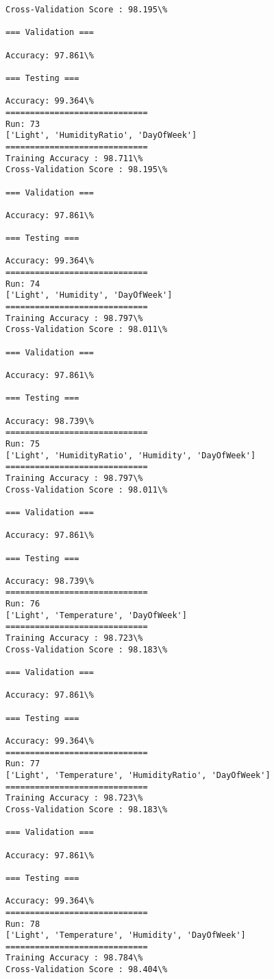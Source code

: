 \documentclass[11pt]{article}
\begin{document}
    \begin{Verbatim}[commandchars=\\\{\}]
Cross-Validation Score : 98.195\%

=== Validation ===

Accuracy: 97.861\%

=== Testing ===

Accuracy: 99.364\%
=============================
Run: 73
['Light', 'HumidityRatio', 'DayOfWeek']
=============================
Training Accuracy : 98.711\%
Cross-Validation Score : 98.195\%

=== Validation ===

Accuracy: 97.861\%

=== Testing ===

Accuracy: 99.364\%
=============================
Run: 74
['Light', 'Humidity', 'DayOfWeek']
=============================
Training Accuracy : 98.797\%
Cross-Validation Score : 98.011\%

=== Validation ===

Accuracy: 97.861\%

=== Testing ===

Accuracy: 98.739\%
=============================
Run: 75
['Light', 'HumidityRatio', 'Humidity', 'DayOfWeek']
=============================
Training Accuracy : 98.797\%
Cross-Validation Score : 98.011\%

=== Validation ===

Accuracy: 97.861\%

=== Testing ===

Accuracy: 98.739\%
=============================
Run: 76
['Light', 'Temperature', 'DayOfWeek']
=============================
Training Accuracy : 98.723\%
Cross-Validation Score : 98.183\%

=== Validation ===

Accuracy: 97.861\%

=== Testing ===

Accuracy: 99.364\%
=============================
Run: 77
['Light', 'Temperature', 'HumidityRatio', 'DayOfWeek']
=============================
Training Accuracy : 98.723\%
Cross-Validation Score : 98.183\%

=== Validation ===

Accuracy: 97.861\%

=== Testing ===

Accuracy: 99.364\%
=============================
Run: 78
['Light', 'Temperature', 'Humidity', 'DayOfWeek']
=============================
Training Accuracy : 98.784\%
Cross-Validation Score : 98.404\%


\end{Verbatim}
\end{document}
